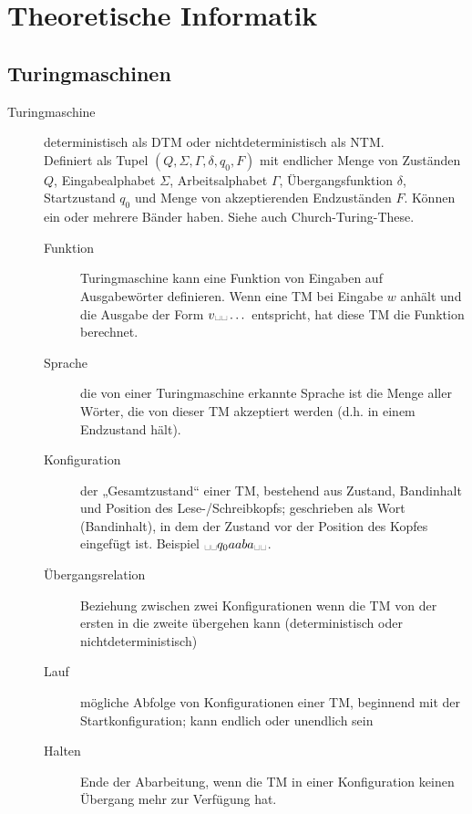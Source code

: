\section{Theoretische Informatik}
\subsection{Turingmaschinen}
    \begin{description}
        \item[Turingmaschine] deterministisch als DTM oder nichtdeterministisch als NTM. \\
            Definiert als Tupel $(Q,\Sigma,\Gamma,\delta,q_0,F)$ mit endlicher Menge von Zuständen $Q$, Eingabealphabet $\Sigma$, Arbeitsalphabet $\Gamma$, Übergangsfunktion $\delta$, Startzustand $q_0$ und Menge von akzeptierenden Endzuständen $F$. Können ein oder mehrere Bänder haben. Siehe auch Church-Turing-These.  

            \begin{description}
                \item[Funktion] Turingmaschine kann eine Funktion von Eingaben auf Ausgabewörter definieren. Wenn eine TM bei Eingabe $w$ anhält und die Ausgabe der Form $v\blank\blank\dots$ entspricht, hat diese TM die Funktion berechnet.
                \item[Sprache] die von einer Turingmaschine erkannte Sprache ist die Menge aller Wörter, die von dieser TM akzeptiert werden (d.h. in einem Endzustand hält).

                \item[Konfiguration]
                    der „Gesamtzustand“ einer TM, bestehend aus Zustand, Bandinhalt und Position des Lese-/Schreibkopfs;
                    geschrieben als Wort (Bandinhalt), in dem der Zustand vor der Position des Kopfes eingefügt ist. Beispiel $ \blank\blank q_0aaba \blank\blank$.
                \item[Übergangsrelation]
                    Beziehung zwischen zwei Konfigurationen wenn die TM von der ersten in die zweite übergehen kann
                    (deterministisch oder nichtdeterministisch)
                \item[Lauf] mögliche Abfolge von Konfigurationen einer TM, beginnend mit der Startkonfiguration; kann endlich oder unendlich sein
                \item[Halten] Ende der Abarbeitung, wenn die TM in einer Konfiguration keinen Übergang mehr zur Verfügung hat.


\end{description}
\end{description}

